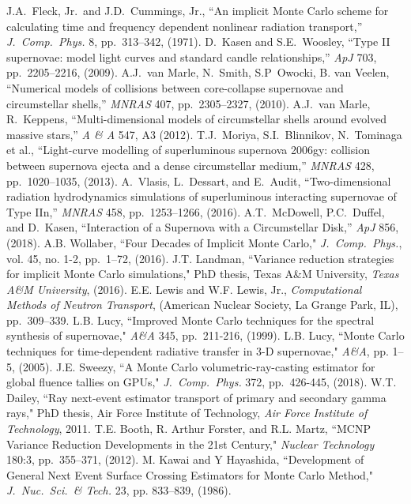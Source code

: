 \documentclass[]{article}
\begin{document}
\begin{thebibliography}{99}
 J.A.\ Fleck, Jr.\ and J.D.\ Cummings, Jr., ``An implicit Monte Carlo scheme for calculating time and frequency dependent nonlinear radiation transport,''
  	{\em J.\ Comp.\ Phys.} 8, pp.\ 313--342, (1971).
 D.\ Kasen and S.E.\ Woosley, ``Type II supernovae: model light curves and standard candle relationships,''
  	{\em ApJ} 703, pp.\ 2205--2216, (2009).
 A.J.\ van Marle, N.\ Smith, S.P\ Owocki, B. van Veelen, ``Numerical models of collisions between core-collapse supernovae and circumstellar shells,''
	{\em MNRAS} 407, pp.\ 2305--2327, (2010).
 A.J.\ van Marle, R.\ Keppens, ``Multi-dimensional models of circumstellar shells around evolved massive stars,''
	{\em A \& A} 547, A3 (2012).
 T.J.\ Moriya, S.I.\ Blinnikov, N.\ Tominaga et al., ``Light-curve modelling of superluminous supernova 2006gy: collision between supernova ejecta and a dense circumstellar medium,''
  	{\em MNRAS} 428, pp.\ 1020--1035, (2013).
 A.\ Vlasis, L.\ Dessart, and E.\ Audit, ``Two-dimensional radiation hydrodynamics simulations of superluminous interacting supernovae of Type IIn,''
  	{\em MNRAS} 458, pp.\ 1253--1266, (2016).
 A.T.\ McDowell, P.C.\ Duffel, and D.\ Kasen, ``Interaction of a Supernova with a Circumstellar Disk,''
  	{\em ApJ} 856, (2018).
 A.B. Wollaber, ``Four Decades of Implicit Monte Carlo," 
  	{\em J.\ Comp.\ Phys.}, vol. 45, no. 1-2, pp.\ 1--72, (2016).
 J.T. Landman, ``Variance reduction strategies for implicit Monte Carlo simulations," PhD thesis, Texas A\&M University, 
   	{\em Texas A\&M University}, (2016).
 E.E. Lewis and W.F. Lewis, Jr., {\em Computational Methods of Neutron Transport}, (American Nuclear Society, La Grange Park, IL), pp.\ 309--339. 
 L.B. Lucy, ``Improved Monte Carlo techniques for the spectral synthesis of supernovae," 
	{\em A\&A} 345, pp.\ 211-216, (1999).
 L.B. Lucy, ``Monte Carlo techniques for time-dependent radiative transfer in 3-D supernovae,"
	{\em A\&A}, pp. 1--5, (2005).
 J.E. Sweezy, ``A Monte Carlo volumetric-ray-casting estimator for global fluence tallies on GPUs,"
	{\em J.\ Comp.\ Phys.} 372, pp.\ 426-445, (2018).
 W.T. Dailey, ``Ray next-event estimator transport of primary and secondary gamma rays," PhD thesis, Air Force Institute of Technology, 
	{\em Air Force Institute of Technology}, 2011.
 T.E. Booth, R. Arthur Forster, and R.L. Martz, ``MCNP Variance Reduction Developments in the 21st Century,"
	{\em  Nuclear Technology} 180:3, pp.\ 355--371, (2012).	
 M. Kawai and Y Hayashida, ``Development of General Next Event Surface Crossing Estimators for Monte Carlo Method,"
	{\em J.\ Nuc.\ Sci.\ \& Tech.} 23, pp. 833--839, (1986). 
	
\end{thebibliography}
\end{document}
